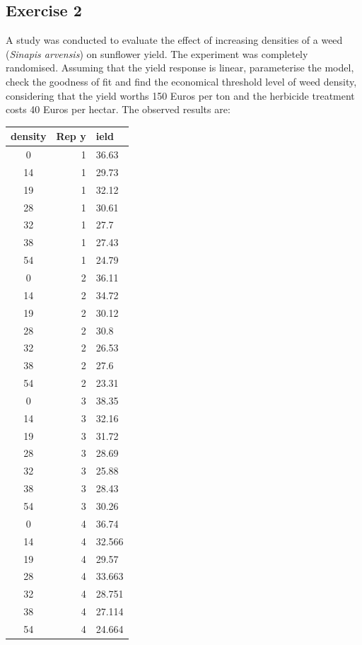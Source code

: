 \documentclass[a4paper,12pt,oneside]{book}
\begin{document}
\hypertarget{exercise-2-8}{%
\subsection{Exercise 2}\label{exercise-2-8}}

A study was conducted to evaluate the effect of increasing densities of a weed (\emph{Sinapis arvensis}) on sunflower yield. The experiment was completely randomised. Assuming that the yield response is linear, parameterise the model, check the goodness of fit and find the economical threshold level of weed density, considering that the yield worths 150 Euros per ton and the herbicide treatment costs 40 Euros per hectar. The observed results are:

\begin{longtable}[]{@{}crl@{}}
\toprule
density & Rep y & ield \\
\midrule
\endhead
0 & 1 & 36.63 \\
14 & 1 & 29.73 \\
19 & 1 & 32.12 \\
28 & 1 & 30.61 \\
32 & 1 & 27.7 \\
38 & 1 & 27.43 \\
54 & 1 & 24.79 \\
0 & 2 & 36.11 \\
14 & 2 & 34.72 \\
19 & 2 & 30.12 \\
28 & 2 & 30.8 \\
32 & 2 & 26.53 \\
38 & 2 & 27.6 \\
54 & 2 & 23.31 \\
0 & 3 & 38.35 \\
14 & 3 & 32.16 \\
19 & 3 & 31.72 \\
28 & 3 & 28.69 \\
32 & 3 & 25.88 \\
38 & 3 & 28.43 \\
54 & 3 & 30.26 \\
0 & 4 & 36.74 \\
14 & 4 & 32.566 \\
19 & 4 & 29.57 \\
28 & 4 & 33.663 \\
32 & 4 & 28.751 \\
38 & 4 & 27.114 \\
54 & 4 & 24.664 \\
\bottomrule
\end{longtable}
\end{document}
